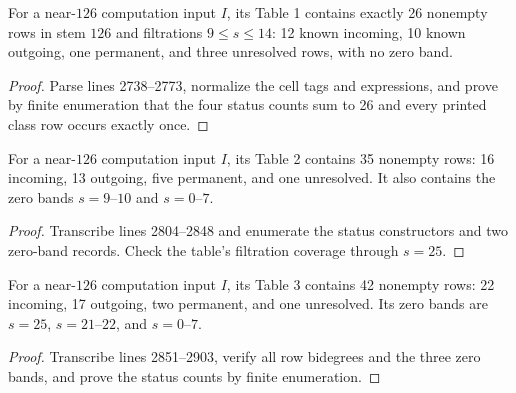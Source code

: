 \begin{proposition}
  \label{data:table-cnu126}
  \notready
  For a near-$126$ computation input $I$, its Table 1 contains exactly 26
  nonempty rows in stem $126$ and filtrations
  $9\le s\le14$: 12 known incoming, 10 known outgoing, one permanent, and
  three unresolved rows, with no zero band.
\end{proposition}

\begin{proof}
  Parse lines 2738--2773, normalize the cell tags and expressions, and prove
  by finite enumeration that the four status counts sum to 26 and every
  printed class row occurs exactly once.
\end{proof}

\begin{proposition}
  \label{data:table-s122}
  \notready
  For a near-$126$ computation input $I$, its Table 2 contains 35 nonempty
  rows: 16 incoming, 13 outgoing, five permanent, and one unresolved.  It also
  contains the zero bands $s=9$--$10$ and $s=0$--$7$.
\end{proposition}

\begin{proof}
  Transcribe lines 2804--2848 and enumerate the status constructors and two
  zero-band records.  Check the table's filtration coverage through $s=25$.
\end{proof}

\begin{proposition}
  \label{data:table-s123}
  \notready
  For a near-$126$ computation input $I$, its Table 3 contains 42 nonempty
  rows: 22 incoming, 17 outgoing, two permanent, and one unresolved.  Its zero
  bands are $s=25$, $s=21$--$22$, and $s=0$--$7$.
\end{proposition}

\begin{proof}
  Transcribe lines 2851--2903, verify all row bidegrees and the three zero
  bands, and prove the status counts by finite enumeration.
\end{proof}

